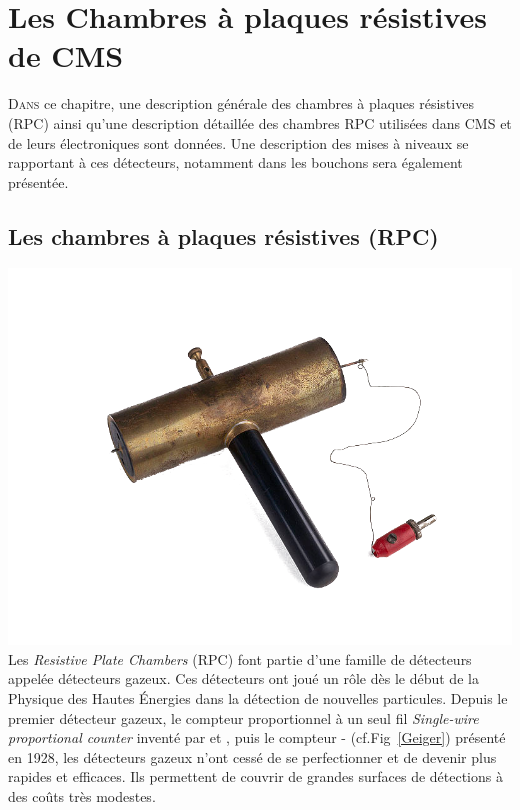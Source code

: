 \chapter{Les Chambres à plaques résistives de CMS}
\renewcommand\chapterillustration{RPC/rpc}
\ThisULCornerWallPaper{1}{\chapterillustration}
\minitoc

\lettrine[lines=4, slope=-0.5em]{D}{ans} ce chapitre, une description générale des chambres à plaques résistives (RPC) ainsi qu'une description détaillée des chambres RPC utilisées dans CMS et de leurs électroniques sont données. Une description des mises à niveaux se rapportant à ces détecteurs, notamment dans les bouchons sera également présentée.

\section{Les chambres à plaques résistives (RPC)}

 \marginpar
{
	\centering
	\includegraphics[width=\marginparwidth]{RPC/Geiger.png}
	\label{Geiger}
}
Les \textit{Resistive Plate Chambers} (RPC) font partie d'une famille de détecteurs appelée détecteurs gazeux. Ces détecteurs ont joué un rôle dès le début de la Physique des Hautes Énergies dans la détection de nouvelles particules. Depuis le premier détecteur gazeux, le compteur proportionnel à un seul fil \textit{Single-wire proportional counter} inventé par  et , puis le compteur - (cf.Fig~\ref{Geiger}) présenté en \num{1928}, les détecteurs gazeux n'ont cessé de se perfectionner et de devenir plus rapides et efficaces. Ils permettent de couvrir de grandes surfaces de détections à des coûts très modestes.

